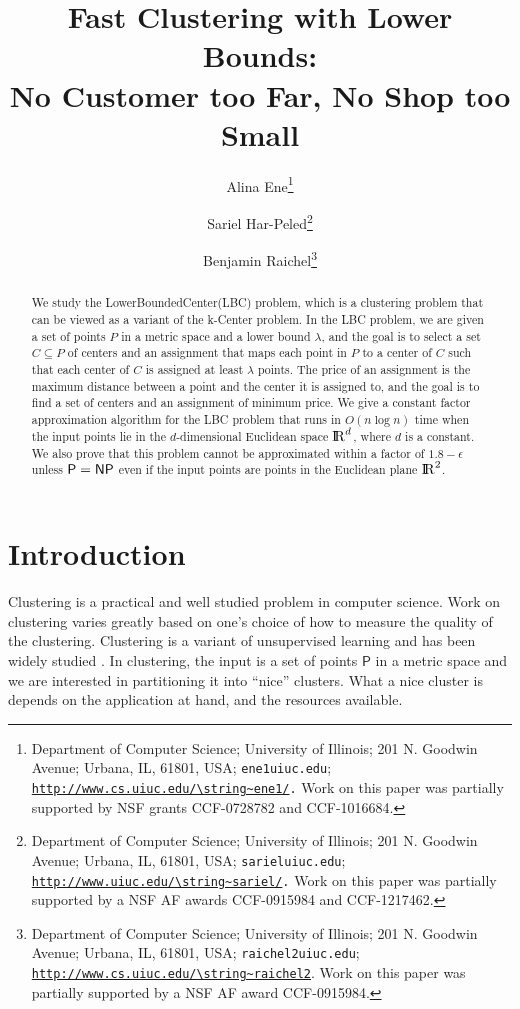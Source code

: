 \ifx\STACS\undefined \documentclass[12pt]{article}\else \documentclass[runningheads,a4paper]{llncs}
\newcommand{\InConfVer}[1]{}
\newcommand{\InConfVer}[1]{#1}
\newcommand{\LowerBoundedCenter}   {\PStyle{{Lower{}Bounded{}Center}}\xspace}
\newcommand{\kCenter} {\PStyle{k-Center}\xspace}
\newcommand{\lbc}{\PStyle{LBC}\xspace}
\providecommand{\si}[1]{#1}
\newcommand{\AlinaThanksInner}[1]{{Department of Computer Science; University of Illinois; 201 N. Goodwin Avenue; Urbana, IL, 61801, USA; {\tt \si{ene}1\atgen{}\si{uiuc}.\si{edu}}; {\tt
         \si{\url{http://www.cs.uiuc.edu/\string~ene1/}}.} #1}}
\newcommand{\AlinaThanks}[1]{\thanks{\AlinaThanksInner{#1}}}
\newcommand{\BenThanksInner}[1]{{Department of Computer Science;
      University of Illinois; 201 N. Goodwin Avenue; Urbana, IL, 61801, USA; {\tt \si{raichel}2\atgen{}\si{uiuc}.\si{edu}}; {\tt \url{\si{http://www.cs.uiuc.edu/\string~\si{raichel2}}}}. #1}}
\newcommand{\BenThanks}[1]{\thanks{\BenThanksInner{#1}}}
\newcommand{\atgen}{\symbol{'100}}
\newcommand{\SarielThanksInner}[1]{{Department of Computer Science;
      University of Illinois; 201 N. Goodwin Avenue; Urbana, IL,
      61801, USA; {\tt \si{sariel}\atgen{}\si{uiuc.edu}}; {\tt \url{http://www.uiuc.edu/\string~sariel/}.} #1}}
\newcommand{\SarielThanks}[1]{\thanks{\SarielThanksInner{#1}}}
\newcommand{\PStyle}[1]{\textcolor{red25}{\textrm{\textsf{#1}}}}
\renewcommand{\Re}{{\rm I\!\hspace{-0.025em} R}}
\newcommand{\PntSet}{\mathsf{P}}\newcommand{\PntSetA}{\mathsf{W}}
\begin{document}
\title{Fast Clustering with Lower Bounds:\\ 
No Customer too Far, No Shop too Small}

\InConfVer{\titlerunning{Fast Clustering with Lower Bounds}\authorrunning{A. Ene, S. Har-Peled, and B. Raichel}
   \institute{}
}
\author{Alina Ene\AlinaThanks{Work on this paper was partially supported by NSF
         grants CCF-0728782 and CCF-1016684.}\and Sariel Har-Peled\SarielThanks{Work on this paper was partially supported by a
         NSF AF awards CCF-0915984 and CCF-1217462.}\and Benjamin Raichel\BenThanks{Work on this paper was partially supported by a NSF
         AF award CCF-0915984.}}




\maketitle



\begin{abstract}
	We study the \LowerBoundedCenter (\lbc) problem, which is a
	clustering problem that can be viewed as a variant of the
	\kCenter problem. In the \lbc problem, we are given a set of
	points $P$ in a metric space and a lower bound $\lambda$, and the
	goal is to select a set $C \subseteq P$ of centers and an
	assignment that maps each point in $P$ to a center of $C$ such
	that each center of $C$ is assigned at least $\lambda$ points.
	The price of an assignment is the maximum distance between a
	point and the center it is assigned to, and the goal is to find a
	set of centers and an assignment of minimum price.
	We give a constant factor approximation algorithm for the \lbc
	problem that runs in $O( n \log n)$ time when the input
	points lie in the $d$-dimensional Euclidean space $\Re^d$, where
	$d$ is a constant.  We also prove that this problem cannot be
	approximated within a factor of $1.8 - \epsilon$ unless $\textsf{P} = \textsf{NP}$
	even if the input points are points in the Euclidean plane
	$\Re^2$.
  \InConfVer{
	\keywords{Clustering, nets, hardness of approximation}}
\end{abstract}



\section{Introduction}


Clustering is a practical and well studied problem in computer
science.  Work on clustering varies greatly based on one's choice of
how to measure the quality of the clustering.  Clustering is a variant
of unsupervised learning and has been widely studied \cite{dhs-pc-01}. In
clustering, the input is a set of points $\PntSet$ in a metric space
and we are interested in partitioning it into ``nice'' clusters. What
a nice cluster is depends on the application at hand, and the resources
available.
\end{document}
